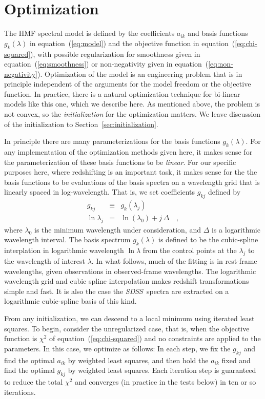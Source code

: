 \documentclass[12pt,preprint]{aastex}
\newcommand{\project}[1]{\textsl{#1}}
\newcommand{\sdss}{\project{SDSS}}
\newcommand{\sectionname}{Section}
\newcommand{\equationname}{equation}
\begin{document}
\section{Optimization}\label{sec:optimization}

The HMF spectral model is defined by the coefficients $a_{ik}$ and basis
functions $g_k(\lambda)$ in \equationname~(\ref{eq:model}) and the
objective function in \equationname~(\ref{eq:chi-squared}), with possible
regularization for smoothness given in
\equationname~(\ref{eq:smoothness}) or non-negativity given in
\equationname~(\ref{eq:non-negativity}).  Optimization of the model is an
engineering problem that is in principle independent of the arguments
for the model freedom or the objective function.  In practice, there
is a natural optimization technique for bi-linear models like this
one, which we describe here.  As mentioned above, the problem is not
convex, so the \emph{initialization} for the optimization matters.  We
leave discussion of the initialization to
\sectionname~\ref{sec:initialization}.

In principle there are many parameterizations for the basis functions
$g_k(\lambda)$.  For any implementation of the optimization methods
given here, it makes sense for the parameterization of these basis
functions to be \emph{linear}.  For our specific purposes here, where
redshifting is an important task, it makes sense for the the basis
functions to be evaluations of the basis spectra on a wavelength grid
that is linearly spaced in log-wavelength.  That is, we set
coefficients $g_{kj}$ defined by
\begin{eqnarray}\displaystyle
g_{kj} & \equiv & g_k(\lambda_j) \nonumber\\
\ln\lambda_j & = & \ln(\lambda_0) + j\,\Delta
\quad ,
\end{eqnarray}
where $\lambda_0$ is the minimum wavelength under consideration, and
$\Delta$ is a logarithmic wavelength interval.  The basis spectrum
$g_k(\lambda)$ is defined to be the cubic-spline interplation in
logarithmic wavelength $\ln\lambda$ from the control points at the
$\lambda_j$ to the wavelength of interest $\lambda$.  In what follows,
much of the fitting is in rest-frame wavelengths, given observations
in observed-frame wavelengths.  The logarithmic wavelength grid and
cubic spline interpolation makes redshift transformations simple and
fast.  It is also the case the \sdss\ spectra are extracted on a
logarithmic cubic-spline basis of this kind.

From any initialization, we can descend to a local minimum using
iterated least squares.  To begin, consider the unregularized case,
that is, when the objective function is $\chi^2$ of
\equationname~(\ref{eq:chi-squared}) and no constraints are applied to
the parameters.  In this case, we optimize as follows: In each step,
we fix the $g_{kj}$ and find the optimal $a_{ik}$ by weighted least
squares, and then hold the $a_{ik}$ fixed and find the optimal
$g_{kj}$ by weighted least squares. Each iteration step is guaranteed
to reduce the total $\chi^2$ and converges (in practice in the tests
below) in ten or so iterations.
\end{document}
